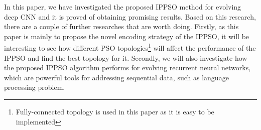 \documentclass[conference]{IEEEtran}
\begin{document}
In this paper, we have investigated the proposed IPPSO method for evolving deep CNN and it is proved of obtaining promising results. Based on this research, there are a couple of further researches that are worth doing. Firstly, as this paper is mainly to propose the novel encoding strategy of the IPPSO, it will be interesting to see how different PSO topologies\footnote{Fully-connected topology is used in this paper as it is easy to be implemented} will affect the performance of the IPPSO and find the best topology for it. Secondly, we will also investigate how the proposed IPPSO algorithm performs for evolving recurrent neural networks, which are powerful tools for addressing sequential data, such as language processing problem.











\end{document}
